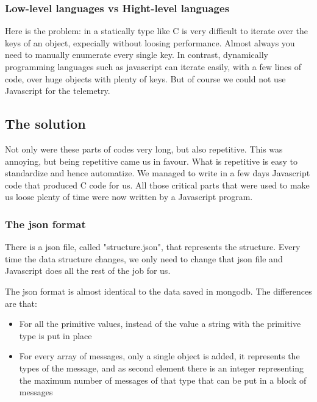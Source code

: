 \subsubsection{Low-level languages vs Hight-level languages}

Here is the problem: in a statically type like C is very difficult to iterate over the keys of an object, expecially without loosing performance.
Almost always you need to manually enumerate every single key. In contrast, dynamically programming languages such as javascript can iterate 
easily, with a few lines of code, over huge objects with plenty of keys. But of course we could not use Javascript for the telemetry.

\subsection{The solution}

Not only were these parts of codes very long, but also repetitive. This was annoying, but being repetitive came us in favour. What is repetitive 
is easy to standardize and hence automatize. We managed to write in a few days Javascript code that produced C code for us. All those critical 
parts that were used to make us loose plenty of time were now written by a Javascript program.

\subsubsection{The json format}

There is a json file, called "structure.json", that represents the structure. Every time the data structure changes, we only need to change that
json file and Javascript does all the rest of the job for us.

The json format is almost identical to the data saved in mongodb. 
The differences are that:
\begin{itemize}
    \item For all the primitive values, instead of the value a string with the primitive type is put in place
    \item For every array of messages, only a single object is added, it represents the types of the message, and as second element there is an integer representing the maximum number of messages of that type that can be put in a block of messages
\end{itemize}

